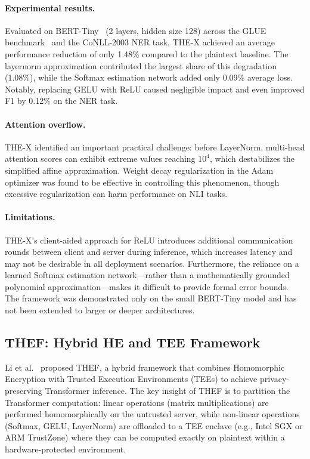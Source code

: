 \paragraph{Experimental results.} Evaluated on BERT-Tiny~\cite{turc2019well} (2 layers, hidden size 128) across the GLUE benchmark~\cite{wang2019glue} and the CoNLL-2003 NER task, THE-X achieved an average performance reduction of only 1.48\% compared to the plaintext baseline. The layernorm approximation contributed the largest share of this degradation (1.08\%), while the Softmax estimation network added only 0.09\% average loss. Notably, replacing GELU with ReLU caused negligible impact and even improved F1 by 0.12\% on the NER task.

\paragraph{Attention overflow.} THE-X identified an important practical challenge: before LayerNorm, multi-head attention scores can exhibit extreme values reaching $10^4$, which destabilizes the simplified affine approximation. Weight decay regularization in the Adam optimizer was found to be effective in controlling this phenomenon, though excessive regularization can harm performance on NLI tasks.

\paragraph{Limitations.} THE-X's client-aided approach for ReLU introduces additional communication rounds between client and server during inference, which increases latency and may not be desirable in all deployment scenarios. Furthermore, the reliance on a learned Softmax estimation network---rather than a mathematically grounded polynomial approximation---makes it difficult to provide formal error bounds. The framework was demonstrated only on the small BERT-Tiny model and has not been extended to larger or deeper architectures.

\subsection{THEF: Hybrid HE and TEE Framework}

Li et al.~\cite{li2024thef} proposed THEF, a hybrid framework that combines Homomorphic Encryption with Trusted Execution Environments (TEEs) to achieve privacy-preserving Transformer inference. The key insight of THEF is to partition the Transformer computation: linear operations (matrix multiplications) are performed homomorphically on the untrusted server, while non-linear operations (Softmax, GELU, LayerNorm) are offloaded to a TEE enclave (e.g., Intel SGX or ARM TrustZone) where they can be computed exactly on plaintext within a hardware-protected environment.


